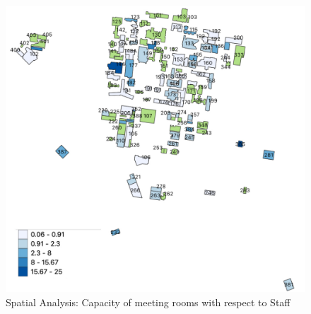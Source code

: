    
\begin{figure}[H]
    \centering
    \includegraphics[width=15cm]{resources/images/capacity_meetingroom.pdf}
    \caption{Spatial Analysis: Capacity of meeting rooms with respect to Staff}
    \label{mr_staff}
\end{figure}
